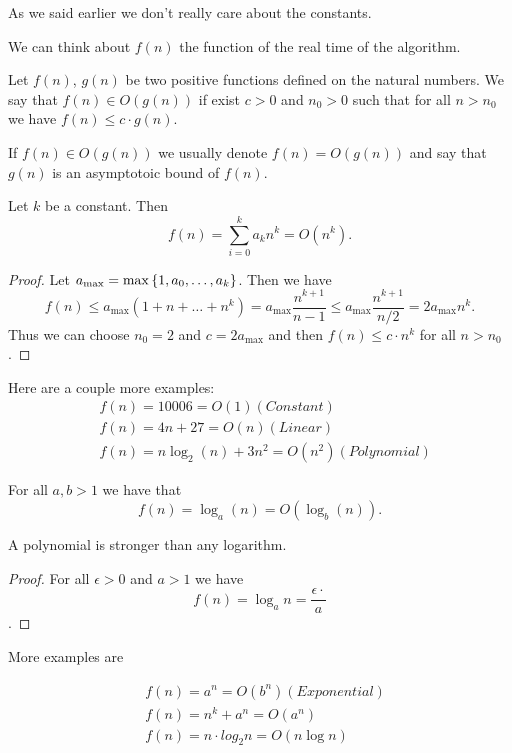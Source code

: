\documentclass[11pt,a4paper]{article}
\begin{document}
As we said earlier we don't really care about the constants.

We can think about $f(n)$ the function of the real time of the algorithm.

\begin{definition}
    Let $f(n)$, $g(n)$ be two positive functions defined on the natural
    numbers.
    We say that $f(n) \in O(g(n))$ if exist $c > 0$ and $n_0 > 0$ such
    that for all $n > n_0$ we have $f(n) \le c \cdot g(n)$.
\end{definition}

If $f(n) \in O(g(n))$ we usually denote $f(n) = O(g(n))$ and say that
$g(n)$ is an asymptotoic bound of $f(n)$.

\begin{proposition}
    Let $k$ be a constant. Then
    \[
        f(n) = \sum_{i=0}^{k} a_k n^k = O(n^k).
    \]
\end{proposition}
\begin{proof}
    Let $a_{\max} = \max\set{1,a_0,\dots,a_k}$.
    Then we have
    \[
        f(n) \le a_{\max}(1 + n + \dots + n^k) =
        a_{\max} \frac{n^{k+1}}{n-1} \le
        a_{\max} \frac{n^{k+1}}{n/2} = 2 a_\max n^k.
    \]
    Thus we can choose $n_0 = 2$ and $c = 2 a_\max$ and then
    $f(n) \le c \cdot n^k$ for all $n > n_0$.
\end{proof}

Here are a couple more examples:
\begin{align*}
    &f(n) = 10006 = O(1) (Constant) \\
    &f(n) = 4n + 27 =O(n) (Linear) \\
    &f(n) = n \log_2(n) + 3n^2 = O(n^2) (Polynomial)
\end{align*}

\begin{proposition}
    For all $a,b > 1$ we have that
    \[
        f(n) = \log_a(n) = O(\log_b(n)).
    \]
\end{proposition}

A polynomial is stronger than any logarithm.

\begin{proof}
    For all $\epsilon > 0$ and $a > 1$ we have
    \[ f(n) = \log_a n = \frac{\epsilon \cdot}{a} \].
\end{proof}

More examples are

\begin{align*}
    &f(n) = a^n = O(b^n) (Exponential) \\
    &f(n) = n^k + a^n = O(a^n) \\
    &f(n) = n \cdot log_2 n = O(n \log n)
\end{align*}
\end{document}
